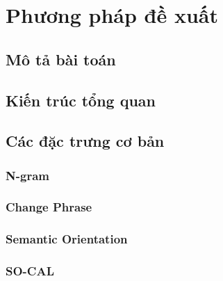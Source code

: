 \section{Phương pháp đề xuất}
\subsection{Mô tả bài toán}
\subsection{Kiến trúc tổng quan}
\subsection{Các đặc trưng cơ bản}
\subsubsection*{N-gram}
\subsubsection*{Change Phrase}
\subsubsection*{Semantic Orientation}
\subsubsection*{SO-CAL}
